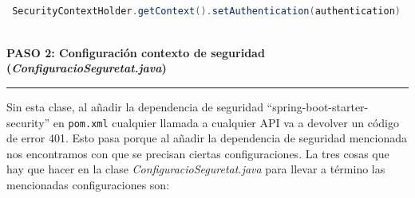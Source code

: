 \documentclass[a4paper,12pt]{report}
\begin{document}
		 
 \begin{lstlisting}[language=Java, basicstyle=\ttfamily\footnotesize, keywordstyle=\color{magenta}]

 SecurityContextHolder.getContext().setAuthentication(authentication)
	
\end{lstlisting}
	
	
	


		\noindent \textbf{PASO 2: Configuración contexto de seguridad (\textit{ConfiguracioSeguretat.java})}
		\hrule
		\vspace{1em}
		
		Sin esta clase, al añadir la dependencia de seguridad ``spring-boot-starter-security'' en \texttt{pom.xml} cualquier llamada a cualquier API va a devolver un código de error 401. Esto pasa porque al añadir la dependencia de seguridad mencionada nos encontramos con que se precisan ciertas configuraciones. La tres cosas que hay que hacer en la clase \textit{ConfiguracioSeguretat.java} para llevar a término las mencionadas configuraciones son:
		
\end{document}
